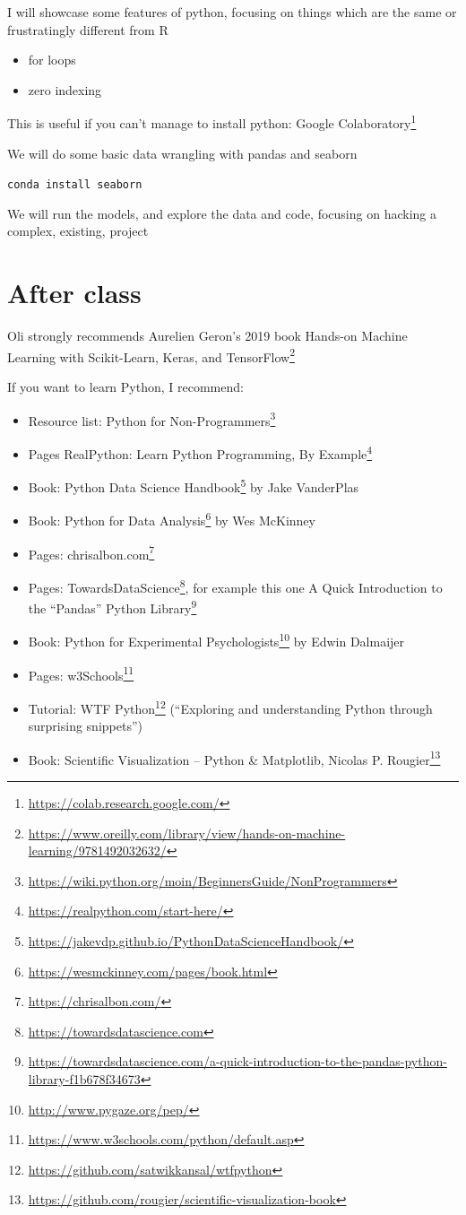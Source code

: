 \documentclass[
  12pt,
  a5paper,
]{book}
\DeclareRobustCommand{\href}[2]{#2\footnote{\url{#1}}}
\providecommand{\tightlist}{%
  \setlength{\itemsep}{0pt}\setlength{\parskip}{0pt}}
\begin{document}
I will showcase some features of python, focusing on things which are the same or frustratingly different from R

\begin{itemize}
\tightlist
\item
  for loops
\item
  zero indexing
\end{itemize}

This is useful if you can't manage to install python: \href{https://colab.research.google.com/}{Google Colaboratory}

We will do some basic data wrangling with pandas and seaborn

\texttt{conda\ install\ seaborn}

We will run the models, and explore the data and code, focusing on hacking a complex, existing, project

\hypertarget{after-class}{%
\section{After class}\label{after-class}}

Oli strongly recommends Aurelien Geron's 2019 book \href{https://www.oreilly.com/library/view/hands-on-machine-learning/9781492032632/}{Hands-on Machine Learning with Scikit-Learn, Keras, and TensorFlow}

If you want to learn Python, I recommend:

\begin{itemize}
\tightlist
\item
  Resource list: \href{https://wiki.python.org/moin/BeginnersGuide/NonProgrammers}{Python for Non-Programmers}
\item
  Pages \href{https://realpython.com/start-here/}{RealPython: Learn Python Programming, By Example}
\item
  Book: \href{https://jakevdp.github.io/PythonDataScienceHandbook/}{Python Data Science Handbook} by Jake VanderPlas
\item
  Book: \href{https://wesmckinney.com/pages/book.html}{Python for Data Analysis} by Wes McKinney
\item
  Pages: \href{https://chrisalbon.com/}{chrisalbon.com}
\item
  Pages: \href{https://towardsdatascience.com}{TowardsDataScience}, for example this one \href{https://towardsdatascience.com/a-quick-introduction-to-the-pandas-python-library-f1b678f34673}{A Quick Introduction to the ``Pandas'' Python Library}
\item
  Book: \href{http://www.pygaze.org/pep/}{Python for Experimental Psychologists} by Edwin Dalmaijer
\item
  Pages: \href{https://www.w3schools.com/python/default.asp}{w3Schools}
\item
  Tutorial: \href{https://github.com/satwikkansal/wtfpython}{WTF Python} (``Exploring and understanding Python through surprising snippets'')
\item
  Book: \href{https://github.com/rougier/scientific-visualization-book}{Scientific Visualization -- Python \& Matplotlib, Nicolas P. Rougier}
\end{itemize}
\end{document}
